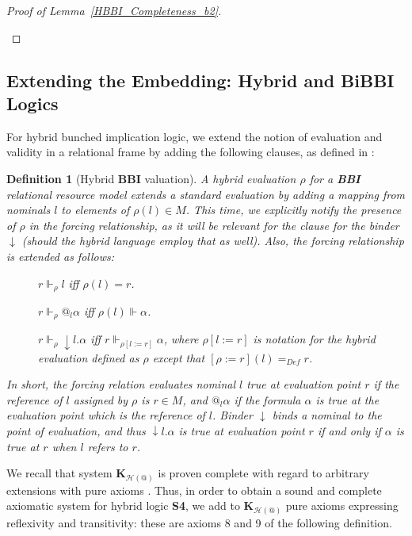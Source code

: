 \documentclass[a4paper]{article}
\newtheorem{definition}[theorem]{Definition}
\newcommand{\BBI}{\textbf{BBI}\xspace}
\newcommand{\SFour}{\textbf{S4}\xspace}
\begin{document}
\begin{proof}[Proof of Lemma~\ref{HBBI_Completeness_b2}]
\begin{description}
    
\end{description}

\end{proof}


\subsection{Extending the Embedding: Hybrid and BiBBI Logics}

For hybrid bunched implication logic, we extend the notion of evaluation and validity in a relational frame by adding the following clauses, as defined in \cite{separation_theories}:

\begin{definition}[Hybrid \BBI valuation] A hybrid evaluation $\rho$ for a \BBI relational resource model extends a standard evaluation by adding a mapping from nominals $l$ to elements of $\rho(l)\in M$. This time, we explicitly notify the presence of $\rho$ in the forcing relationship, as it will be relevant for the clause for the binder $\downarrow$ (should the hybrid language employ that as well). Also, the forcing relationship is extended as follows:

\begin{description}
    \item[] $r\Vdash_\rho l$ iff $\rho(l)=r$.
    \item[] $r \Vdash_\rho @_l \alpha$ iff $\rho(l)\Vdash \alpha$.
    \item[] $r\Vdash_\rho \downarrow l. \alpha$ iff $r \Vdash_{\rho[l:=r]} \alpha$, where $\rho[l:=r]$ is notation for the hybrid evaluation defined as $\rho$ except that $[\rho:=r](l)=_{Def}r$.
\end{description}

In short, the forcing relation evaluates nominal $l$ true at evaluation point $r$ if the reference of $l$ assigned by $\rho$ is $r\in M$, and $@_l\alpha$ if the formula $\alpha$ is true at the evaluation point which is the reference of $l$. Binder $\downarrow$ binds a nominal to the point of evaluation, and thus $\downarrow l. \alpha$ is true at evaluation point $r$ if and only if $\alpha$ is true at $r$ when $l$ refers to $r$.
    
\end{definition}



We recall that system \textbf{K}$_{\mathcal{H}(@)}$ is proven complete with regard to arbitrary extensions with pure axioms \cite{Hybrid_Logic_Pure_extensions}.
Thus, in order to obtain a sound and complete axiomatic system for hybrid logic \SFour, we add to \textbf{K}$_{\mathcal{H}(@)}$ pure axioms expressing reflexivity and transitivity: these are axioms 8 and 9 of the following definition. 
\end{document}

